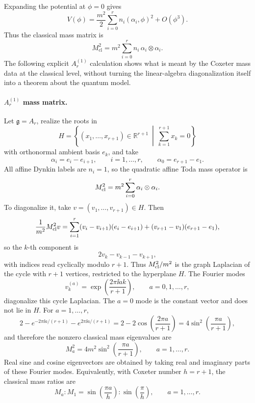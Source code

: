 Expanding the potential at \(\phi=0\) gives
\[
  V(\phi)
  =
  \frac{m^2}{2}
  \sum_{i=0}^r n_i(\alpha_i,\phi)^2+O(\phi^3).
\]
Thus the classical mass matrix is
\[
  M_{\mathrm{cl}}^2
  =
  m^2\sum_{i=0}^r n_i\,\alpha_i\otimes\alpha_i .
\]
The following explicit \(A_r^{(1)}\) calculation shows what is meant by the
Coxeter mass data at the classical level, without turning the linear-algebra
diagonalization itself into a theorem about the quantum model.

\paragraph{\(A_r^{(1)}\) mass matrix.}
Let \(\mathfrak g=A_r\), realize the roots in
\[
  H=\left\{(x_1,\ldots,x_{r+1})\in\mathbb R^{r+1}
    \ \middle|\ \sum_{k=1}^{r+1}x_k=0\right\}
\]
with orthonormal ambient basis \(e_k\), and take
\[
  \alpha_i=e_i-e_{i+1},\qquad i=1,\ldots,r,
  \qquad
  \alpha_0=e_{r+1}-e_1 .
\]
All affine Dynkin labels are \(n_i=1\), so the quadratic affine Toda mass
operator is
\[
  M_{\rm cl}^2
  =
  m^2\sum_{i=0}^{r}\alpha_i\otimes\alpha_i .
\]
To diagonalize it, take \(v=(v_1,\ldots,v_{r+1})\in H\).  Then
\[
  \frac1{m^2}M_{\rm cl}^2 v
  =
  \sum_{i=1}^{r}(v_i-v_{i+1})(e_i-e_{i+1})
  +(v_{r+1}-v_1)(e_{r+1}-e_1),
\]
so the \(k\)-th component is
\[
  2v_k-v_{k-1}-v_{k+1},
\]
with indices read cyclically modulo \(r+1\).  Thus \(M_{\rm cl}^2/m^2\) is
the graph Laplacian of the cycle with \(r+1\) vertices, restricted to the
hyperplane \(H\).  The Fourier modes
\[
  v^{(a)}_k=\exp\!\left(\frac{2\pi\ii ak}{r+1}\right),
  \qquad a=0,1,\ldots,r ,
\]
diagonalize this cycle Laplacian.  The \(a=0\) mode is the constant vector and
does not lie in \(H\).  For \(a=1,\ldots,r\),
\[
  2-e^{-2\pi\ii a/(r+1)}-e^{2\pi\ii a/(r+1)}
  =
  2-2\cos\!\left(\frac{2\pi a}{r+1}\right)
  =
  4\sin^2\!\left(\frac{\pi a}{r+1}\right),
\]
and therefore the nonzero classical mass eigenvalues are
\begin{equation}
  M_a^2
  =
  4m^2\sin^2\!\left(\frac{\pi a}{r+1}\right),
  \qquad a=1,\ldots,r .
  \label{eq:affine-toda-a-r-classical-masses}
\end{equation}
Real sine and cosine eigenvectors are obtained by taking real and imaginary
parts of these Fourier modes.  Equivalently, with Coxeter number \(h=r+1\),
the classical mass ratios are
\[
  M_a:M_1
  =
  \sin\!\left(\frac{\pi a}{h}\right):
  \sin\!\left(\frac{\pi}{h}\right),
  \qquad a=1,\ldots,r .
\]

